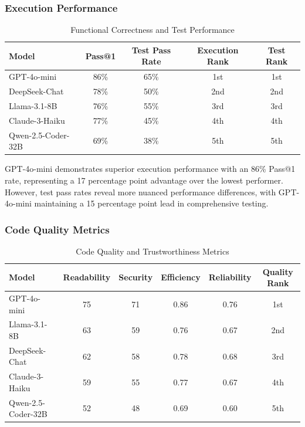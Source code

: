 \documentclass[conference]{IEEEtran}
\begin{document}
\subsubsection{Execution Performance}

\begin{table}[ht]
\centering
\caption{Functional Correctness and Test Performance}
\begin{tabular}{lcccc}
\toprule
\textbf{Model} & \textbf{Pass@1} & \textbf{Test Pass Rate} & \textbf{Execution Rank} & \textbf{Test Rank} \\
\midrule
GPT-4o-mini & 86\% & 65\% & 1st & 1st \\
DeepSeek-Chat & 78\% & 50\% & 2nd & 2nd \\
Llama-3.1-8B & 76\% & 55\% & 3rd & 3rd \\
Claude-3-Haiku & 77\% & 45\% & 4th & 4th \\
Qwen-2.5-Coder-32B & 69\% & 38\% & 5th & 5th \\
\bottomrule
\end{tabular}
\label{tab:functional_correctness}
\end{table}

GPT-4o-mini demonstrates superior execution performance with an 86\% Pass@1 rate, representing a 17 percentage point advantage over the lowest performer. However, test pass rates reveal more nuanced performance differences, with GPT-4o-mini maintaining a 15 percentage point lead in comprehensive testing.

\subsubsection{Code Quality Metrics}

\begin{table}[ht]
\centering
\caption{Code Quality and Trustworthiness Metrics}
\begin{tabular}{lccccc}
\toprule
\textbf{Model} & \textbf{Readability} & \textbf{Security} & \textbf{Efficiency} & \textbf{Reliability} & \textbf{Quality Rank} \\
\midrule
GPT-4o-mini & 75 & 71 & 0.86 & 0.76 & 1st \\
Llama-3.1-8B & 63 & 59 & 0.76 & 0.67 & 2nd \\
DeepSeek-Chat & 62 & 58 & 0.78 & 0.68 & 3rd \\
Claude-3-Haiku & 59 & 55 & 0.77 & 0.67 & 4th \\
Qwen-2.5-Coder-32B & 52 & 48 & 0.69 & 0.60 & 5th \\
\bottomrule
\end{tabular}
\label{tab:code_quality}
\end{table}
\end{document}
